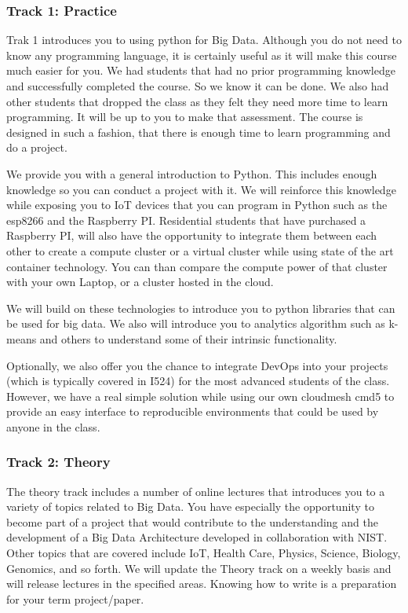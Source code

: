 \subsubsection{Track 1: Practice}\label{track-1-practice}

Trak 1 introduces you to using python for Big Data. Although you do not
need to know any programming language, it is certainly useful as it will
make this course much easier for you. We had students that had no prior
programming knowledge and successfully completed the course. So we know
it can be done. We also had other students that dropped the class as
they felt they need more time to learn programming. It will be up to you
to make that assessment. The course is designed in such a fashion, that
there is enough time to learn programming and do a project.

We provide you with a general introduction to Python. This includes
enough knowledge so you can conduct a project with it. We will reinforce
this knowledge while exposing you to IoT devices that you can program in
Python such as the esp8266 and the Raspberry PI. Residential students
that have purchased a Raspberry PI, will also have the opportunity to
integrate them between each other to create a compute cluster or a
virtual cluster while using state of the art container technology. You
can than compare the compute power of that cluster with your own Laptop,
or a cluster hosted in the cloud.

We will build on these technologies to introduce you to python libraries
that can be used for big data. We also will introduce you to analytics
algorithm such as k-means and others to understand some of their
intrinsic functionality.

Optionally, we also offer you the chance to integrate DevOps into your
projects (which is typically covered in I524) for the most advanced
students of the class. However, we have a real simple solution while
using our own cloudmesh cmd5 to provide an easy interface to
reproducible environments that could be used by anyone in the class.

\subsubsection{Track 2: Theory}\label{track-2-theory}

The theory track includes a number of online lectures that introduces
you to a variety of topics related to Big Data. You have especially the
opportunity to become part of a project that would contribute to the
understanding and the development of a Big Data Architecture developed
in collaboration with NIST. Other topics that are covered include IoT,
Health Care, Physics, Science, Biology, Genomics, and so forth. We will
update the Theory track on a weekly basis and will release lectures in
the specified areas. Knowing how to write is a preparation for your term
project/paper.

